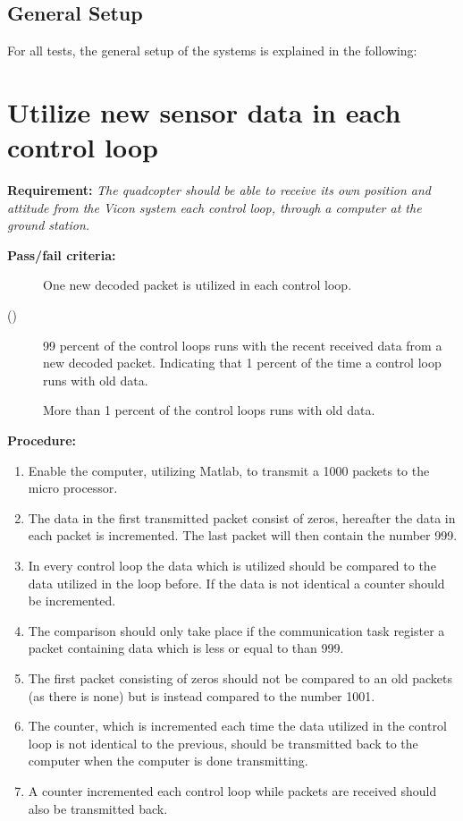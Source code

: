 \subsection*{General Setup}\label{sec:General_setup}
For all tests, the general setup of the systems is explained in the following: 


\section{Utilize new sensor data in each control loop}
\textbf{Requirement:}
\textit{The quadcopter should be able to receive its own position and attitude from the Vicon system each control loop, through a computer at the ground station.}

\textbf{Pass/fail criteria:}
	\begin{description}
	\item[  ] One new decoded packet is utilized in each control loop.
	\item[()] 99 percent of the control loops runs with the recent received data from a new decoded packet. Indicating that 1 percent of the time a control loop runs with old data.
	\item[  \phantom{)}] More than 1 percent of the control loops runs with old data.
	\end{description}

		
\textbf{Procedure:}\\

\begin{enumerate}
	\item Enable the computer, utilizing Matlab, to transmit a 1000 packets to the micro processor.
	\item The data in the first transmitted packet consist of zeros, hereafter the data in each packet is incremented. The last packet will then contain the number 999. 
	\item In every control loop the data which is utilized should be compared to the data utilized in the loop before. If the data is not identical a counter should be incremented. 
	\item The comparison should only take place if the communication task register a packet containing data which is less or equal to than 999.
	\item The first packet consisting of zeros should not be compared to an old packets (as there is none) but is instead compared to the number 1001. 
	\item The counter, which is incremented each time the data utilized in the control loop is not identical to the previous, should be transmitted back to the computer when the computer is done transmitting.
	\item A counter incremented each control loop while packets are received should also be transmitted back.
\end{enumerate} 

